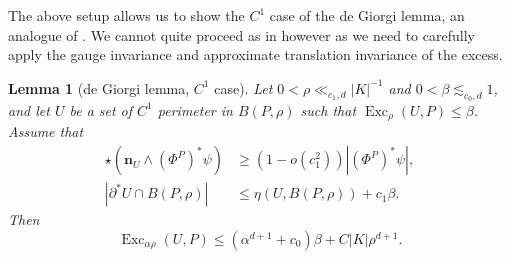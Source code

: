 \documentclass[reqno,10pt]{amsart}
\DeclareMathOperator{\Exc}{Exc}
\newcommand{\normal}{\mathbf n}
\newtheorem{lemma}[theorem]{Lemma}
\theoremstyle{definition}
\numberwithin{equation}{section}
\begin{document}
The above setup allows us to show the $C^1$ case of the de Giorgi lemma, an analogue of \cite[Teorema 4.4]{Miranda66}.
We cannot quite proceed as in \cite{Miranda66} however as we need to carefully apply the gauge invariance and approximate translation invariance of the excess.

\begin{lemma}[de Giorgi lemma, $C^1$ case]\label{Miranda44}
Let $0 < \rho \ll_{c_1, d} |K|^{-1}$ and $0 < \beta \lesssim_{c_0, d} 1$, and let $U$ be a set of $C^1$ perimeter in $B(P, \rho)$ such that $\Exc_\rho (U, P) \leq \beta$. Assume that
\begin{align}
\star(\normal_U \wedge (\Phi^P)^* \psi) &\geq (1 - o(c_1^2)) |(\Phi^P)^* \psi|, \label{Miranda44 normal hyp} \\
|\partial^* U \cap B(P, \rho)| &\leq \eta(U, B(P, \rho)) + c_1 \beta. \label{Miranda44 minimality hyp}
\end{align}
Then
\begin{equation}\label{Miranda44 concl}
\Exc_{\alpha \rho} (U, P) \leq (\alpha^{d + 1} + c_0) \beta + C|K|\rho^{d + 1}.
\end{equation}
\end{lemma}
\end{document}
